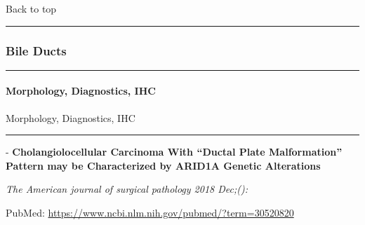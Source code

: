 \documentclass[]{article}
\let\oldparagraph\paragraph
\renewcommand{\paragraph}[1]{\oldparagraph{#1}\mbox{}}
\begin{document}
Back to top

\begin{center}\rule{0.5\linewidth}{\linethickness}\end{center}

\pagebreak

\hypertarget{bile-ducts}{%
\subsubsection{Bile Ducts}\label{bile-ducts}}

\begin{center}\rule{0.5\linewidth}{\linethickness}\end{center}

\hypertarget{morphology-diagnostics-ihc-1}{%
\paragraph{Morphology, Diagnostics,
IHC}\label{morphology-diagnostics-ihc-1}}

Morphology, Diagnostics, IHC

\begin{center}\rule{0.5\linewidth}{\linethickness}\end{center}

 - \textbf{Cholangiolocellular Carcinoma With ``Ductal Plate
Malformation'' Pattern may be Characterized by ARID1A Genetic
Alterations}

\emph{The American journal of surgical pathology 2018 Dec;():}

PubMed: \url{https://www.ncbi.nlm.nih.gov/pubmed/?term=30520820}
\end{document}
